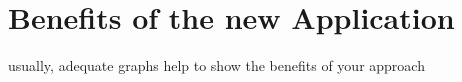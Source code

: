 \chapter{Benefits of the new Application} %

\label{ch:benefitsofthenewapplication} %
usually, adequate graphs help to show the benefits of your approach
